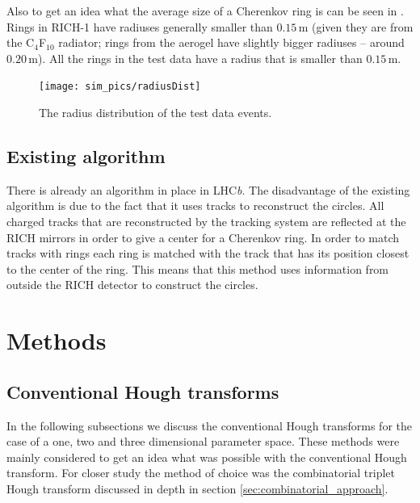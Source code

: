 \documentclass[11pt,twoside]{scrreprt}
\begin{document}
Also to get an idea what the average size of a Cherenkov ring is can be seen in
\cite{Forty1999}. Rings in RICH-1 have radiuses generally smaller than $0.15$\,m
(given they are from the C$_4$F$_{10}$ radiator; rings from the aerogel have
slightly bigger radiuses -- around $0.20$\,m). All the rings in the test data 
have a radius that is smaller than $0.15$\,m.

\begin{figure}[tb]
  \centering
  \texttt{[image: sim\_pics/radiusDist]}
  \caption{The radius distribution of the test data events.}
  \label{fig:radius_dist}
\end{figure}

\section{Existing algorithm} %
\label{sub:existing_algorithm}
There is already an algorithm in place in LHC\textit{b}. The disadvantage of the existing algorithm is due to the fact that it
uses tracks to reconstruct the circles. All charged tracks that are reconstructed by the tracking system are reflected at
the RICH mirrors in order to give a center for a Cherenkov ring. In order to match tracks with rings each ring is matched
with the track that has its position closest to the center of the ring. This means that this method uses information from
outside the RICH detector to construct the circles.


\chapter{Methods}

\section{Conventional Hough transforms} %
\label{sec:conventional_hough_transforms}

In the following subsections we discuss the conventional Hough transforms for the case of a one, two and three dimensional parameter space. These
methods were mainly considered to get an idea what was possible with the conventional Hough transform. For closer study the method of choice was
the combinatorial triplet Hough transform discussed in depth in section \ref{sec:combinatorial_approach}.
\end{document}
